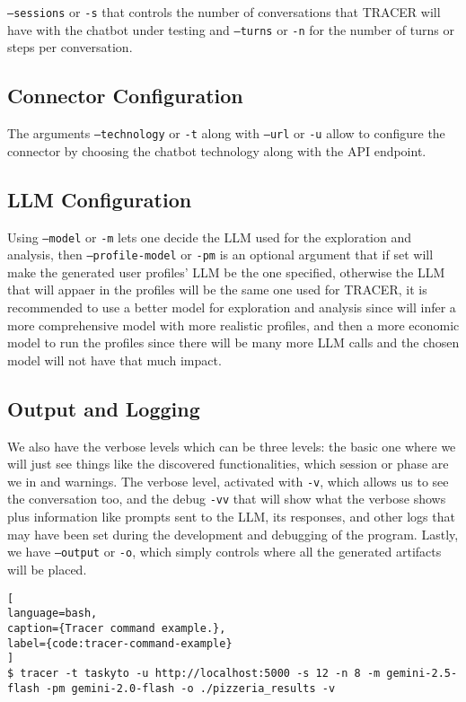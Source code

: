 \texttt{--sessions} or \texttt{-s} that controls the number of conversations
that \ac{TRACER} will have with the chatbot under testing
and \texttt{--turns} or \texttt{-n} for the number of turns or steps per conversation.

\subsection{Connector Configuration}

The arguments \texttt{--technology} or \texttt{-t} along with \texttt{--url} or \texttt{-u}
allow to configure the connector by choosing
the chatbot technology along with the \ac{API} endpoint.

\subsection{LLM Configuration}

Using \texttt{--model} or \texttt{-m} lets one decide the \acl{LLM} used for the exploration and analysis,
then \texttt{--profile-model} or \texttt{-pm} is an optional argument
that if set will make the generated user profiles' \ac{LLM} be the one specified,
otherwise the \ac{LLM} that will appaer in the profiles will be the same one used for \ac{TRACER},
it is recommended to use a better model for exploration and analysis
since will infer a more comprehensive model with more realistic profiles,
and then a more economic model to run the profiles
since there will be many more \ac{LLM} calls
and the chosen model will not have that much impact.

\subsection{Output and Logging}

We also have the verbose levels which can be three levels:
the basic one where we will just see things like the discovered functionalities,
which session or phase are we in and warnings.
The verbose level, activated with \texttt{-v},
which allows us to see the conversation too,
and the debug \texttt{-vv} that will show what the verbose shows plus information like
prompts sent to the \ac{LLM}, its responses,
and other logs that may have been set during the development and debugging of the program.
Lastly, we have \texttt{--output} or \texttt{-o},
which simply controls where all the generated artifacts will be placed.

\begin{lstlisting}[
language=bash,
caption={Tracer command example.},
label={code:tracer-command-example}
]
$ tracer -t taskyto -u http://localhost:5000 -s 12 -n 8 -m gemini-2.5-flash -pm gemini-2.0-flash -o ./pizzeria_results -v
\end{lstlisting}

